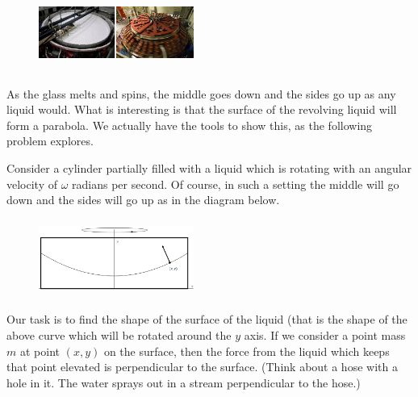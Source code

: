 \begin{figure}
\captionsetup{labelformat=empty}
\centerline{\includegraphics*[height=1in,width=2in]{Figures/SpinCasting2}}
\label{fig:}
\end{figure}
As the glass melts and spins, the middle goes down and the sides go up
as any liquid would.  What is interesting is that the surface of the
revolving liquid will form a parabola.  We actually have the tools to
show this, as the following problem explores.    

\begin{embeddedproblem}{}
  Consider a cylinder partially filled with a liquid which is rotating
  with an angular velocity of $\omega$ radians per second.  Of course, in
  such a setting the middle will go down and the sides will go up as
  in the diagram below.
\begin{figure}
\captionsetup{labelformat=empty}
\centerline{\includegraphics*[height=1in,width=2in]{Figures/SpinCasting3}}
\label{fig:}
\end{figure}
\end{embeddedproblem}
Our task is to find the shape of the surface of the liquid (that is
the shape of the above curve which will be rotated around the $y$ axis.
If we consider a point mass $m$ at point $(x,y)$ on the surface, then the
force from the liquid which keeps that point elevated is perpendicular
to the surface.  (Think about a hose with a hole in it.  The water
sprays out in a stream perpendicular to the hose.)   



